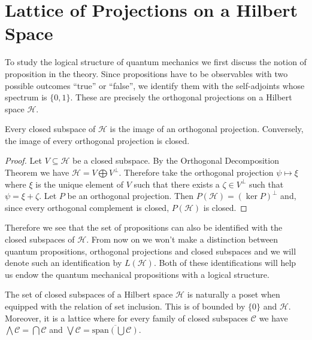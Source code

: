 \section{Lattice of Projections on a Hilbert Space}\label{sec:Q_logic}

To study the logical structure of quantum mechanics we first discuss the notion of proposition in the theory. Since propositions have to be observables with two possible outcomes ``true'' or ``false'', we identify them with the self-adjoints whose spectrum is $\{0,1\}$. These are precisely the orthogonal projections on a Hilbert space $\mathcal{H}$.

\begin{theorem}
Every closed subspace of $\mathcal{H}$ is the image of an orthogonal projection. Conversely, the image of every orthogonal projection is closed.
\end{theorem}
\begin{proof}
Let $V\subseteq\mathcal{H}$ be a closed subspace.  By the Orthogonal Decomposition Theorem we have $\mathcal{H}=V\bigoplus V^{\bot}$. Therefore take the orthogonal projection $\psi\mapsto\xi$ where $\xi$ is the unique element of $V$ such that there exists a $\zeta\in V^{\bot}$ such that $\psi=\xi+\zeta$.
Let $P$ be an orthogonal projection. Then $P(\mathcal{H})=(\ker P)^{\bot}$ and, since every orthogonal complement is closed, $P(\mathcal{H})$ is closed.
\end{proof}

Therefore we see that the set of propositions can also be identified with the closed subspaces of $\mathcal{H}$. From now on we won't make a distinction between quantum propositions, orthogonal projections and closed subspaces and we will denote such an identification by $L(\mathcal{H})$. Both of these identifications will help us endow the quantum mechanical propositions with a logical structure.

\begin{theorem}\label{thm:quantum_complements}
The set of closed subspaces of a Hilbert space $\mathcal{H}$ is naturally a poset when equipped with the relation of set inclusion. This is of bounded by $\{0\}$ and $\mathcal{H}$. Moreover, it is a lattice where for every family of closed subspaces $\mathcal{C}$ we have $\bigwedge \mathcal{C} = \bigcap \mathcal{C}$ and $\bigvee \mathcal{C} = \overline{\text{span}\left(\bigcup\mathcal{C}\right)}$.
\end{theorem}

